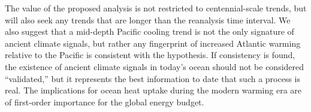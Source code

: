\documentclass[authoryear,round,12pt]{article}
\begin{document}
The value of the proposed analysis is not restricted to centennial-scale trends, but will also
seek any trends that are longer than the reanalysis time interval. We also suggest that a mid-depth Pacific cooling trend is not the only signature of ancient climate signals, but rather any fingerprint of increased Atlantic warming relative to the Pacific is consistent with the  \citet{Gebbie-Huybers-2019:Little} hypothesis. If consistency is found, the existence of ancient climate signals in today's ocean should not be considered ``validated,'' but it represents the best information to date that such a process is real. The implications for ocean heat uptake during the modern warming era are of first-order importance for the global energy budget. 








\end{document}
